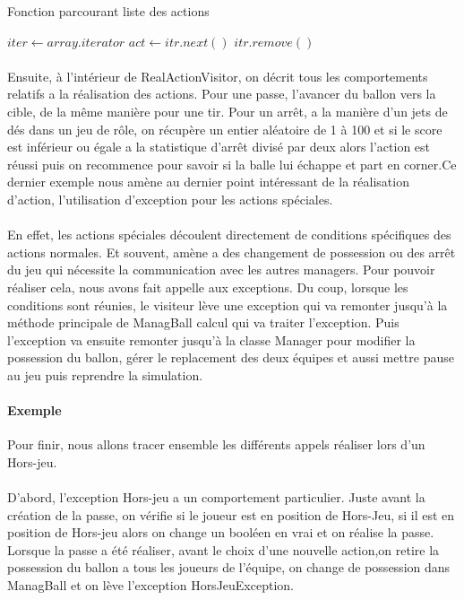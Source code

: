 \begin{algorithm}
\caption{Fonction parcourant liste des actions}
\label{algo:visit}
\begin{algorithmic} 
\STATE $iter \leftarrow array.iterator$
\STATE $ act \leftarrow itr.next()$
\STATE $itr.remove()$
\ENDIF
\ENDWHILE
\end{algorithmic}
\end{algorithm}

\paragraph{}
    Ensuite, à l'intérieur de RealActionVisitor, on décrit tous les comportements relatifs a la réalisation des actions. Pour une passe, l'avancer du ballon vers la cible, de la même manière pour une tir. Pour un arrêt, a la manière d'un jets de dés dans un jeu de rôle, on récupère un entier aléatoire de 1 à 100 et si le score est inférieur ou égale a la statistique d'arrêt divisé par deux alors l'action est réussi puis on recommence pour savoir si la balle lui échappe et part en corner.Ce dernier exemple nous amène au dernier point intéressant de la réalisation d'action, l'utilisation d'exception pour les actions spéciales.

\paragraph{}
    En effet, les actions spéciales découlent directement de conditions spécifiques des actions normales. Et souvent, amène a des changement de possession ou des arrêt du jeu qui nécessite la communication avec les autres managers. Pour pouvoir réaliser cela, nous avons fait appelle aux exceptions. Du coup, lorsque les conditions sont réunies, le visiteur lève une exception qui va remonter jusqu'à la méthode principale de ManagBall calcul qui va traiter l'exception. Puis l'exception va ensuite remonter jusqu'à la classe Manager pour modifier la possession du ballon, gérer le replacement des deux équipes et aussi mettre pause au jeu puis reprendre la simulation.

\paragraph{Exemple}
    Pour finir, nous allons tracer ensemble les différents appels réaliser lors d'un Hors-jeu.
    
\paragraph{}
    D'abord, l'exception Hors-jeu a un comportement particulier. Juste avant la création de la passe, on vérifie si le joueur est en position de Hors-Jeu, si il est en position de Hors-jeu alors on change un booléen en vrai et on réalise la passe. Lorsque la passe a été réaliser, avant le choix d'une nouvelle action,on retire la possession du ballon a tous les joueurs de l'équipe, on change de possession dans ManagBall et on lève l'exception HorsJeuException.
    
